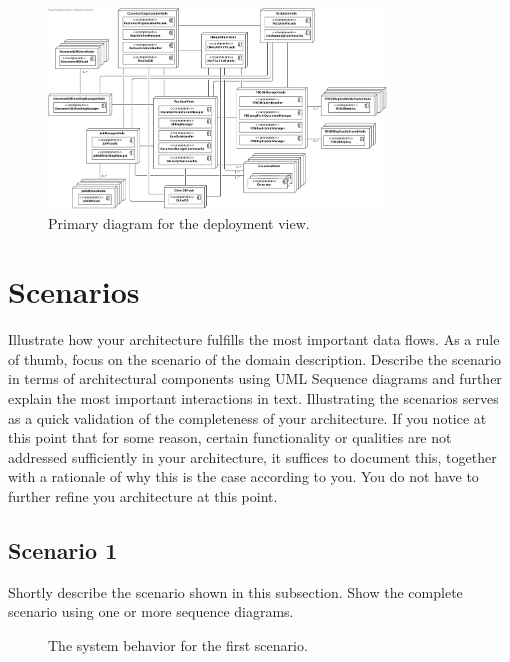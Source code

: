 \documentclass[a4paper,10pt]{article}
\begin{document}
\begin{figure}[!htp]
    \centering
	\includegraphics[width=0.8\textwidth]{TotalDeployment.png}
    \caption{Primary diagram for the deployment view.}
    \label{fig:depl_primary}
\end{figure}
\FloatBarrier

\section{Scenarios}\label{sec:scenarios}
Illustrate how your architecture fulfills the most important data flows.
As a rule of thumb, focus on the scenario of the domain description.
Describe the scenario in terms of architectural components using UML Sequence
diagrams and further explain the most important interactions in text.
Illustrating the scenarios serves as a quick validation of the completeness of
your architecture.
If you notice at this point that for some reason, certain functionality or
qualities are not addressed sufficiently in your architecture, it suffices to
document this, together with a rationale of why this is the case according to
you.
You do not have to further refine you architecture at this point.

\subsection{Scenario 1}
Shortly describe the scenario shown in this subsection.
Show the complete scenario using one or more sequence diagrams.

\begin{figure}[!htp]
    \centering
    \caption{The system behavior for the first scenario.
        }\label{fig:seq_scenario1}
\end{figure}
\end{document}

